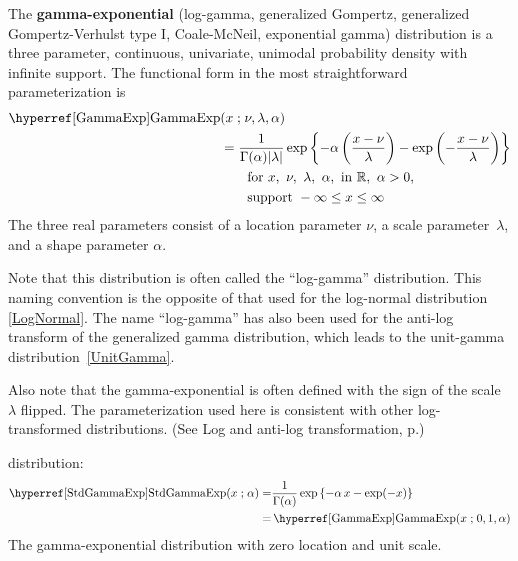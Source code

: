 

\label{sec:GammaExp}
{} 

The {\bf gamma-exponential} (log-gamma, generalized Gompertz, generalized Gompertz-Verhulst type I, Coale-McNeil, exponential gamma) distribution \cite{Bartlett1946,Prentice1974,Johnson1995} is  a three parameter, continuous, univariate, unimodal probability density with infinite support. The functional form in the most straightforward parameterization is
\begin{align}
\label{GammaExp}
\opr{GammaExp}&(x\given \nu, \lambda, \alpha) 
\\ \notag &=
\frac{1}{ \Gamma(\alpha) |\lambda|}  \exp\left\{- \alpha \left(\frac{x-\nu}{\lambda}\right) - \exp\left(- \frac{x-\nu}{\lambda}\right)  \right\} \checked 
\\ \notag
& \qquad \text{for } x,\ \nu,\ \lambda,\ \alpha,\   \text{in } \mathbb{R}, 
\ \alpha>0, \ 
\\ \notag
& \qquad \text{support } -\infty \leq x \leq \infty
\notag
\end{align}
The three real parameters consist of a location parameter $\nu$, a scale parameter~$\lambda$, and a shape parameter $\alpha$. 

Note that this distribution is often called the ``log-gamma'' distribution. This naming convention is the opposite of that used for the log-normal distribution \eqref{LogNormal}. The name  ``log-gamma''  has also been used for the anti-log transform of the generalized gamma distribution, which leads to the unit-gamma distribution~\eqref{UnitGamma}.%

Also note that the gamma-exponential is often defined with the sign of the scale $\lambda$ flipped. The parameterization used here is consistent with other log-transformed distributions. (See Log and anti-log transformation, p.\pageref{logtransform}) 





 distribution:
\begin{align}
\label{StdGammaExp}
\opr{StdGammaExp}(x\given  \alpha) 
=&
\frac{1}{\Gamma(\alpha) }  \exp\left\{- \alpha\, x - \exp (-x)  \right\}  \checked
\\ \notag =& \opr{GammaExp}(x\given 0,1,\alpha) \checked
\end{align} 
The gamma-exponential distribution with zero location and unit scale.

